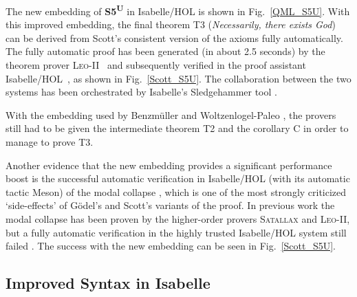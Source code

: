 \documentclass{article}
\newcommand{\logic}[1]{\textbf{#1}\xspace}
\newcommand{\SFiveU}{\logic{S5\textsuperscript{U}}}
\begin{document}
The new embedding of \SFiveU in Isabelle/HOL is shown in
Fig.~\ref{QML_S5U}.
With this improved embedding, the final theorem T3
(\textit{Necessarily, there exists God}) can be derived from
Scott's consistent version of the axioms fully automatically.  The fully
automatic proof has been generated (in about 2.5 seconds) by the theorem prover
\textsc{Leo-II}~\cite{leo2} and subsequently verified in the proof
assistant Isabelle/HOL~\cite{NPW02}, as shown in Fig.~\ref{Scott_S5U}.
The collaboration between the two systems has been orchestrated by
Isabelle's Sledgehammer tool \cite{Sledgehammer}.

With the embedding used by Benzm\"uller and Woltzenlogel-Paleo , the
provers still had to be given the intermediate theorem T2 and the corollary
C in order to manage to prove T3.

Another evidence that the new embedding provides a significant performance boost 
is the successful automatic verification in Isabelle/HOL (with its automatic tactic Meson) of the modal
collapse \cite{Sobel}, which is one of the most strongly criticized
`side-effects' of G\"odel's and Scott's variants of the proof. In previous work 
the modal collapse has been proven by the higher-order provers
\textsc{Satallax} \cite{Satallax} and \textsc{Leo-II}, but a fully automatic
verification in the highly trusted Isabelle/HOL system still failed
\cite{J28}.  The success with the new embedding can be seen in Fig.~\ref{Scott_S5U}.




\subsection{Improved Syntax in Isabelle}\label{sec:improvedsyntax}
\end{document}
